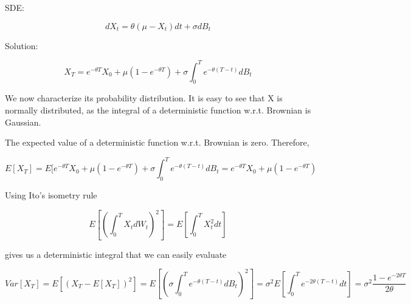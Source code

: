 \documentclass[c, dvipsnames, 8pt]{beamer}
\begin{document}
\begin{frame}[shrink=5]
	
SDE: 	
	
	\begin{equation}\label{key}
dX_t = \theta ( \mu  - X_t)  dt + \sigma  d B_t
\end{equation}
	
Solution:
	

\begin{equation}\label{key}
X_T    =   e^{-\theta T} X_0   +  \mu (1-e^{-\theta T} )     +  \sigma \int_0^T   e^{-\theta (T-t)} d B_t
\end{equation}
	
	
	
	

We now characterize its probability distribution. It is easy to see that X is normally distributed, as the integral of a deterministic function w.r.t. Brownian is Gaussian.

The expected value of a deterministic function w.r.t. Brownian is zero. Therefore, 

\begin{equation}\label{key}
E[X_T]    =   E[e^{-\theta T} X_0   +  \mu (1-e^{-\theta T} )     +  \sigma \int_0^T   e^{-\theta (T-t)} d B_t =  e^{-\theta T} X_0   +  \mu (1-e^{-\theta T} )  
\end{equation}

Using Ito's isometry rule 

\begin{equation}\label{key}
E[(\int_0^T X_t dW_t )^2] = E[\int_0^T X^2_t dt]
\end{equation}

gives us a deterministic integral that we can easily evaluate

\begin{equation}\label{key}
Var[X_T]    = E[(X_T-E[X_T] )^2] =   E[ (\sigma \int_0^T   e^{-\theta (T-t)} d B_t)^2] =  \sigma^2 E[  \int_0^T   e^{-2\theta (T-t)} d  t] =   \sigma^2 \dfrac{1 - e^{-2\theta T}}{2\theta}
\end{equation}


\end{frame}
\end{document}
